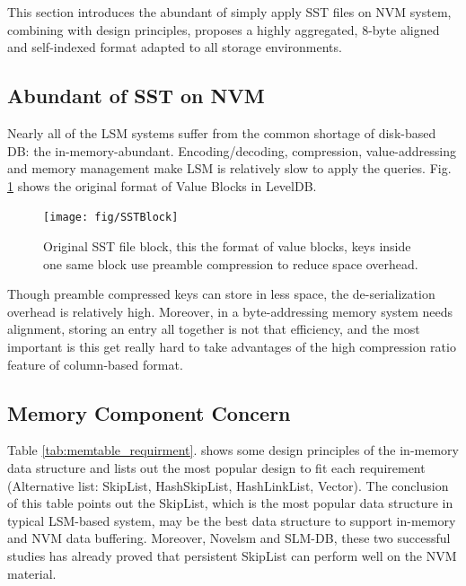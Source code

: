 This section introduces the abundant of simply apply SST files on NVM system, combining with design principles, proposes a highly aggregated, 8-byte aligned and self-indexed format adapted to all storage environments.

\subsection{Abundant of SST on NVM}
Nearly all of the LSM systems suffer from the common shortage of disk-based DB\cite{sauer2018fineline}: the in-memory-abundant. Encoding/decoding, compression, value-addressing and memory management make LSM is relatively slow to apply the queries. Fig. \ref{fig:sstblock} shows the original format of Value Blocks in LevelDB.

\begin{figure}
	\centering
	\texttt{[image: fig/SSTBlock]}
	\caption{Original SST file block, this the format of value blocks, keys inside one same block use preamble compression to reduce space overhead.}
	\label{fig:sstblock}
\end{figure}

Though preamble compressed keys can store in less space, the de-serialization overhead is relatively high. Moreover, in a byte-addressing memory system needs alignment, storing an entry all together is not that efficiency, and the most important is this get really hard to take advantages of the high compression ratio feature of column-based format.


\subsection{Memory Component Concern}
Table \ref{tab:memtable_requirment}. shows some design principles of the in-memory data structure and lists out the most popular design to fit each requirement\cite{MemTable29:online} (Alternative list: SkipList, HashSkipList, HashLinkList, Vector). The conclusion of this table points out the SkipList, which is the most popular data structure in typical LSM-based system, may be the best data structure to support in-memory and NVM data buffering. Moreover, Novelsm\cite{kannan2018redesigning} and SLM-DB\cite{kaiyrakhmet2019slm}, these two successful studies has already proved that persistent SkipList can perform well on the NVM material.


